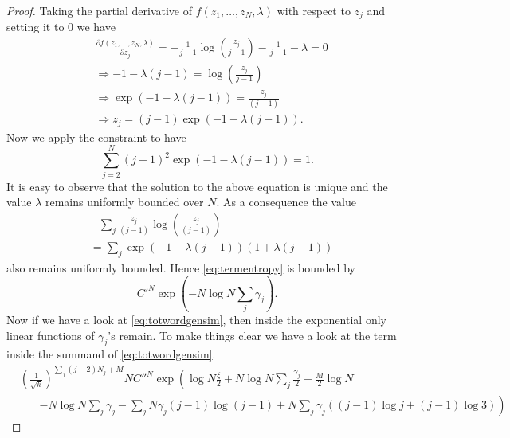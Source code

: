 \documentclass[12pt]{article}
\numberwithin{equation}{section}
\numberwithin{equation}{section}
\theoremstyle{definition}
\renewcommand{\1}{\bf 1}
\begin{document}
\begin{proof}
Taking the partial derivative of $f(z_{1},\ldots, z_{N},\lambda)$ with respect to $z_{j}$ and setting it to $0$  we have 
\begin{equation}
\begin{split}
& \frac{\partial f(z_{1},\ldots, z_{N},\lambda)}{\partial z_{j}}=  - \frac{1}{j-1}\log \left( \frac{z_{j}}{j-1} \right)- \frac{1}{j-1} -\lambda =0 \\
& \Rightarrow - 1 - \lambda(j-1) = \log\left( \frac{z_{j}}{j-1} \right)\\
& \Rightarrow  \exp\left(-1 - \lambda (j-1) \right) = \frac{z_{j}}{(j-1)}\\
& \Rightarrow z_{j}= (j-1) \exp\left( -1 - \lambda(j-1) \right).
\end{split}
\end{equation}
Now we apply the constraint to have 
\begin{equation}\label{eq:constraint}
\sum_{j=2}^{N}\left( j-1 \right)^{2} \exp \left(-1 - \lambda (j-1)  \right)=1. 
\end{equation}
It is easy to observe that the solution to the above equation is unique and the value $\lambda$ remains uniformly bounded over $N$.
As a consequence the value 
\begin{equation}
\begin{split}
&-\sum_{j} \frac{z_{j}}{(j-1)}\log\left( \frac{z_{j}}{(j-1)} \right)\\
& = \sum_{j} \exp\left( -1 - \lambda(j-1) \right)\left( 1+ \lambda (j-1) \right)
\end{split}
\end{equation}
also remains uniformly bounded. 
Hence \eqref{eq:termentropy} is bounded by 
\begin{equation}\label{eq:termentropyfinal}
C'^{N} \exp\left( -N\log N  \sum_{j}\gamma_{j} \right).
\end{equation}
Now if we have a look at \eqref{eq:totwordgensim}, then inside the exponential only linear functions of $\gamma_{j}$'s remain. To make things clear we have a look at the term inside the summand of \eqref{eq:totwordgensim}. 
\begin{equation}\label{eq:firstreduction}
\begin{split}
& \left( \frac{1}{\sqrt{k}} \right)^{\sum_{j}(j-2)N_{j}+M}NC''^{N} \exp\left(\log N \frac{\xi}{2} + N\log N \sum_{j}\frac{\gamma_{j}}{2}  + \frac{M}{2}\log N\right.\\
&~~~~~~~~\left.  -  N \log N \sum_{j}\gamma_{j} - \sum_{j}N\gamma_{j}(j-1)\log(j-1)+ N \sum_{j} \gamma_{j}\left( (j-1)\log j + (j-1)\log 3 \right)\right)

\end{split}
\end{equation}
\end{proof}
\end{document}
